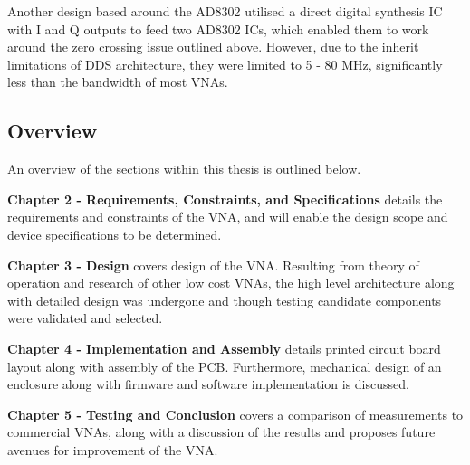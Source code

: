 Another design based around the AD8302 \cite{torre_vna} utilised a direct digital synthesis IC with I and Q outputs to feed two AD8302 ICs, which enabled them to work around the zero crossing issue outlined above. However, due to the inherit limitations of DDS architecture, they were limited to 5 - 80 MHz, significantly less than the bandwidth of most VNAs. 

\subsection{Overview}
An overview of the sections within this thesis is outlined below.

\textbf{Chapter 2 - Requirements, Constraints, and Specifications} details the requirements and constraints of the VNA, and will enable the design scope and device specifications to be determined. 

\textbf{Chapter 3 - Design} covers design of the VNA. Resulting from theory of operation and research of other low cost VNAs, the high level architecture along with detailed design was undergone and though testing candidate components were validated and selected.  

\textbf{Chapter 4 - Implementation and Assembly} details printed circuit board layout along with assembly of the PCB. Furthermore, mechanical design of an enclosure along with firmware and software implementation is discussed. 

\textbf{Chapter 5 - Testing and Conclusion} covers a comparison of measurements to commercial VNAs, along with a discussion of the results and proposes future avenues for improvement of the VNA. 
